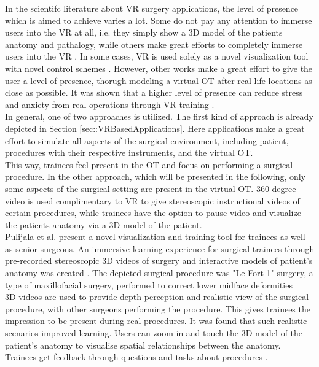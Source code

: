 In the scientifc literature about VR surgery applications, the level of presence which is aimed to achieve varies a lot.
Some do not pay any attention to immerse users into the VR at all, i.e. they simply show a 3D model of the patients anatomy and pathalogy, while others make great efforts to completely immerse users into the VR \cite{Vaughan.2016}.
In some cases, VR is used solely as a novel visualization tool with novel control schemes \cite{.2017}.
However, other works make a great effort to give the user a level of presence, thorugh modeling a virtual OT after real life locations as close as possible.
It was shown that a higher level of presence can reduce stress and anxiety from real operations through VR training \cite{Pulijala.2017,Pulijala.2018,Pulijala.2018b}.
\\ In general, one of two approaches is utilized.
The first kind of approach is already depicted in Section \ref{sec::VRBasedApplications}.
Here applications make a great effort to simulate all aspects of the surgical environment, including patient, procedures with their respective instruments, and the virtual OT.
\\ This way, trainees feel present in the OT and focus on performing a surgical procedure.
In the other approach, which will be presented in the following, only some aspects of the surgical setting are present in the virtual OT.
360 degree video is used complimentary to VR to give stereoscopic instructional videos of certain procedures, while trainees have the option to pause video and visualize the patients anatomy via a 3D model of the patient.
\\Pulijala et al. present a novel visualization and training tool for trainees as well as senior surgeons.
An immersive learning experience for surgical trainees through pre-recorded stereoscopic 3D videos of surgery and interactive models of patient’s anatomy was created \cite{Pulijala.2017}.
The depicted surgical procedure was "Le Fort 1" surgery, a type of maxillofacial surgery, performed to correct lower midface deformities \cite{Pulijala.2017}
\\ 3D videos are used to provide depth perception and realistic view of the surgical procedure, with other surgeons performing the procedure.
This gives trainees the impression to be present during real procedures.
It was found that such realistic scenarios improved learning.
Users can zoom in and touch the 3D model of the patient's anatomy to visualise spatial relationships between the anatomy.
Trainees get feedback through questions and tasks about procedures \cite{Pulijala.2017,Pulijala.2018}.

